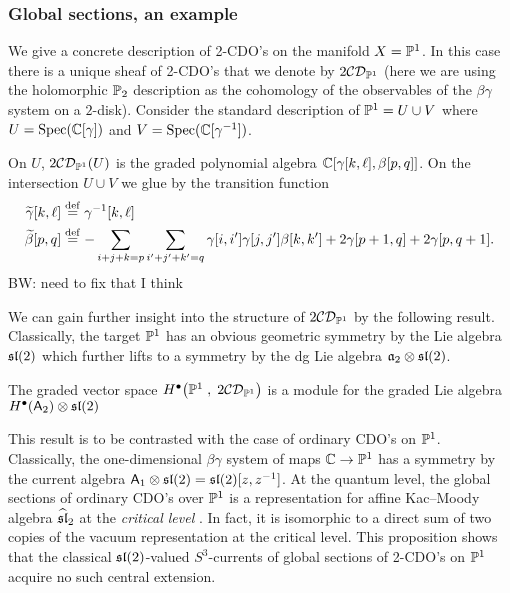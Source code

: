 \documentclass[11pt]{amsart}
\def\CDO{{\cC\cD}}
\def\brian#1{{\textcolor{blue!65!red}{BW: {#1}}}}
\begin{document}
\subsubsection{Global sections, an example}

We give a concrete description of 2-CDO's on the manifold $X = \PP^1$.
In this case there is a unique sheaf of 2-CDO's that we denote by $2\CDO_{\PP^1}$ (here we are using the holomorphic $\PP_2$ description as the cohomology of the observables of the $\beta\gamma$ system on a $2$-disk).
Consider the standard description of $\PP^1 = U \cup V$ where $U = {\rm Spec}(\CC[\gamma])$ and $V = {\rm Spec}(\CC[\gamma^{-1}])$. 

On $U$, $2\CDO_{\PP^1}(U)$ is the graded polynomial algebra $\CC[\gamma[k,\ell], \beta[p,q]]$. 
On the intersection $U \cup V$ we glue by the transition function
\begin{align*}
\Tilde{\gamma} [k,\ell] & \define \gamma^{-1} [k,\ell] \\
\Tilde{\beta} [p,q] & \define - \sum_{i+j+k=p} \sum_{i'+j'+k'=q} \gamma[i,i'] \gamma[j,j'] \beta[k,k'] + 2 \gamma[p+1, q] + 2 \gamma[p, q+1] .
\end{align*}
\brian{need to fix that I think}

We can gain further insight into the structure of $2\CDO_{\PP^1}$ by the following result. 
Classically, the target $\PP^1$ has an obvious geometric symmetry by the Lie algebra $\sl(2)$ which further lifts to a symmetry by the dg Lie algebra $\fa_2 \otimes \sl(2)$. 

\begin{prop}
The graded vector space $H^\bu \big(\PP^1 \; , \; 2 \CDO_{\PP^1}\big)$ is a module for the graded Lie algebra $H^\bu(\sfA_2) \otimes \sl(2)$
\end{prop}

\begin{rmk}
This result is to be contrasted with the case of ordinary CDO's on $\PP^1$. 
Classically, the one-dimensional $\beta\gamma$ system of maps $\CC \to \PP^1$ has a symmetry by the current algebra $\sfA_1 \otimes \sl(2) = \sl(2)[z,z^{-1}]$. 
At the quantum level, the global sections of ordinary CDO's over $\PP^1$ is a representation for affine Kac--Moody algebra $\Hat{\sl}_2$ at the {\em critical level} \cite[Theorem 5.7]{MSV}. 
In fact, it is isomorphic to a direct sum of two copies of the vacuum representation at the critical level.
This proposition shows that the classical $\sl(2)$-valued $S^3$-currents of global sections of 2-CDO's on $\PP^1$ acquire no such central extension. 
\end{rmk}
\end{document}
